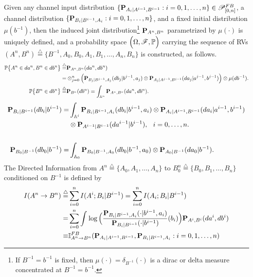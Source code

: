 \documentclass[11pt, a4paper, journal,onecolumn]{IEEEtran}
\newcommand{\mb}{\mathbb}
\newcommand{\sr}{\stackrel}
\newcommand{\rar}{\rightarrow}
\newcommand{\tri}{\sr{\triangle}{=}}
\newcommand{\hso}{\hspace{.1in}}
\begin{document}
Given any channel input distribution $\{{\bf  P}_{A_i|A^{i-1}, B^{i-1}}: i=0,1, \ldots, n\} \in {\cal P}_{[0,n]}^{FB}$,  a channel distribution $\{{\bf P}_{B_i|B^{i-1}, A_i}: i=0,1, \ldots, n\}$, and a fixed initial distribution $\mu(b^{-1})$,  then the  induced joint distribution\footnote{If $B^{-1}=b^{-1}$ is fixed, then $\mu(\cdot)=\delta_{B^{-1}}(\cdot)$ is a dirac or delta measure concentrated at $B^{-1}=b^{-1}$.}  ${\bf  P}_{A^n, B^n}$ parametrized by $\mu(\cdot)$ 
is uniquely defined, and a probability space $\Big(\Omega, {\cal F}, {\mathbb P}\Big)$ carrying the sequence of RVs $(A^n, B^n)\tri \{B^{-1}, A_0, B_0, A_1, B_1, \ldots, A_n, B_n\}$  is constructed, as follows.
\begin{align}
 {\mathbb P}\big\{A^n \in d{a}^n, B^n \in d{b}^n\big\}  \tri &
{\bf  P}_{A^n, B^n}(da^n, db^n) \nonumber \\
=&\otimes_{j=0}^n \Big({\bf P}_{B_j|B^{j-1}, A_j}(db_j|b^{j-1}, a_j)\otimes {\bf P}_{A_j|A^{j-1}, B^{j-1}}(da_j|a^{j-1}, b^{j-1})\Big)\otimes \mu(db^{-1}). \label{CIS_2gg_new} \\
{\mathbb  P}\big\{B^n \in db^n\big\} \tri& {\bf  P}_{B^n}(db^n) =  \int_{{\mb A}^n}  {\bf  P}_{A^n, B^n}(da^n, db^n). \label{CIS_3g} 
\end{align}
\begin{align}
{\bf  P}_{B_i|B^{i-1}}(db_i|b^{i-1})=&  \int_{{\mb A}^i} {\bf P}_{B_i|B^{i-1}, A_i}(db_i|b^{i-1}, a_i)\otimes {\bf P}_{A_i|A^{i-1}, B^{i-1}}(da_i|a^{i-1}, b^{i-1}) \nonumber \\
&\otimes {\bf  P}_{A^{i-1}|B^{i-1}}(da^{i-1}|b^{i-1}), \hso  i=0, \ldots, n . \label{CIS_3a}\\ \nonumber\\
{\bf  P}_{B_0|B^{-1}}(db_0|b^{-1})=&  \int_{{\mb A}_0} {\bf P}_{B_0|B^{-1}, A_0}(db_0|b^{-1}, a_0)\otimes {\bf P}_{A_0| B^{-1}}(da_0| b^{-1}). \label{CIS_3ain}
\end{align}
The Directed Information from $A^n\tri\{A_0,A_1,\ldots,A_n\}$ to $B_0^n\tri\{B_0,B_1,\ldots,B_n\}$ conditioned on $B^{-1}$ is defined by \cite{marko1973, massey1990}
\begin{align}
I(A^n\rightarrow B^n)\tri&\sum_{i=0}^{n}I(A^i;B_i|B^{i-1}) = \sum_{i=0}^n I(A_i; B_i|B^{i-1})\nonumber\\
=& \sum_{i=0}^n \int_{  }^{}   \log \Big( \frac{ {\bf P}_{B_i|B^{i-1}, A_i}(\cdot|b^{i-1}, a_i) }{{\bf P}_{B_i|B^{i-1}}(\cdot|b^{i-1})}(b_i)\Big){ \bf P}_{A^i, B^i}( da^i, db^i) \label{eqdi5_a} \\
\equiv & {\mathbb I}_{A^n \rar B^n}^{FB}({\bf P}_{A_i|A^{i-1},B^{i-1}},  {\bf P}_{B_i|B^{i-1},A_i}: i=0,1, \ldots, n)        \label{eqdi5}
\end{align}
\end{document}
